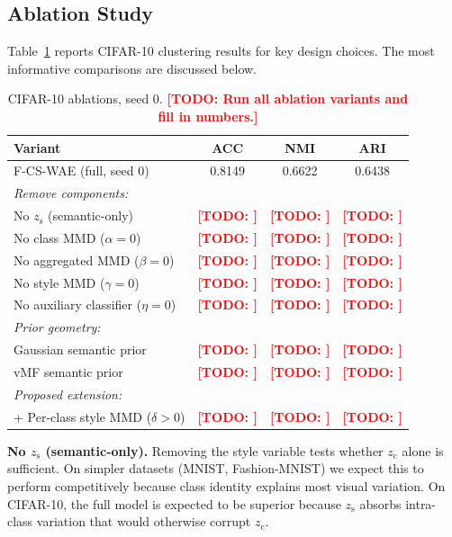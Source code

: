 \documentclass[10pt]{article}
\newcommand{\todo}[1]{\textcolor{red}{\textbf{[TODO: #1]}}}
\newcommand{\ours}{F-CS-WAE}
\newcommand{\zc}{z_{\mathrm{c}}}
\newcommand{\zs}{z_{\mathrm{s}}}
\begin{document}
\subsection{Ablation Study}
\label{sec:ablations}

Table~\ref{tab:ablations} reports CIFAR-10 clustering results for key design
choices.
The most informative comparisons are discussed below.

\begin{table}[t]
\centering
\caption{CIFAR-10 ablations, seed 0.
         \todo{Run all ablation variants and fill in numbers.}}
\label{tab:ablations}
\renewcommand{\arraystretch}{1.05}
\begin{tabular}{lccc}
\toprule
Variant & ACC & NMI & ARI \\
\midrule
\ours{} (full, seed 0)       & 0.8149 & 0.6622 & 0.6438 \\
\midrule
\emph{Remove components:}    & & & \\
\quad No $\zs$ (semantic-only)            & \todo{} & \todo{} & \todo{} \\
\quad No class MMD ($\alpha{=}0$)         & \todo{} & \todo{} & \todo{} \\
\quad No aggregated MMD ($\beta{=}0$)     & \todo{} & \todo{} & \todo{} \\
\quad No style MMD ($\gamma{=}0$)         & \todo{} & \todo{} & \todo{} \\
\quad No auxiliary classifier ($\eta{=}0$)& \todo{} & \todo{} & \todo{} \\
\midrule
\emph{Prior geometry:}       & & & \\
\quad Gaussian semantic prior             & \todo{} & \todo{} & \todo{} \\
\quad vMF semantic prior                  & \todo{} & \todo{} & \todo{} \\
\midrule
\emph{Proposed extension:}   & & & \\
\quad + Per-class style MMD ($\delta{>}0$)& \todo{} & \todo{} & \todo{} \\
\bottomrule
\end{tabular}
\end{table}

\textbf{No $\zs$ (semantic-only).}
Removing the style variable tests whether $\zc$ alone is sufficient.
On simpler datasets (MNIST, Fashion-MNIST) we expect this to perform competitively
because class identity explains most visual variation.
On CIFAR-10, the full model is expected to be superior because $\zs$ absorbs
intra-class variation that would otherwise corrupt $\zc$.
\end{document}
